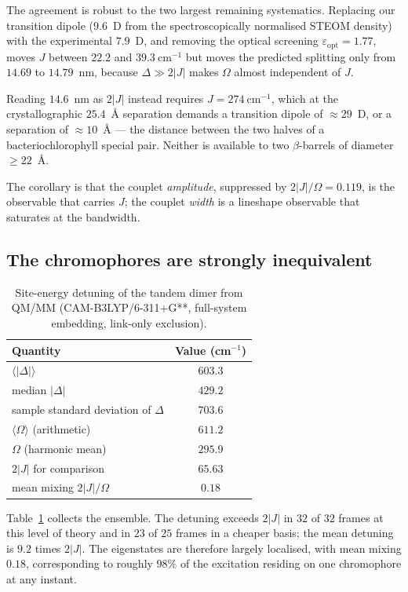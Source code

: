\documentclass[journal=jpcbfk, manuscript=article, layout=twocolumn, doi=true]{achemso}
\begin{document}
The agreement is robust to the two largest remaining systematics. Replacing
our transition dipole ($9.6$~D from the spectroscopically normalised STEOM
density) with the experimental $7.9$~D, and removing the optical screening
$\varepsilon_{\mathrm{opt}} = 1.77$, moves $J$ between $22.2$ and
$39.3~\mathrm{cm^{-1}}$ but moves the predicted splitting only from $14.69$ to
$14.79$~nm, because $\Delta \gg 2|J|$ makes $\Omega$ almost independent of $J$.

Reading $14.6$~nm as $2|J|$ instead requires $J = 274~\mathrm{cm^{-1}}$, which
at the crystallographic $25.4$~\AA{} separation demands a transition dipole of
$\approx 29$~D, or a separation of $\approx 10$~\AA{} --- the distance between
the two halves of a bacteriochlorophyll special pair. Neither is available to
two $\beta$-barrels of diameter $\geq 22$~\AA.

The corollary is that the couplet \emph{amplitude}, suppressed by
$2|J|/\Omega = 0.119$, is the observable that carries $J$; the couplet
\emph{width} is a lineshape observable that saturates at the bandwidth.

\subsection{The chromophores are strongly inequivalent}

\begin{table}[t]
\centering
\caption{Site-energy detuning of the tandem dimer from QM/MM
(CAM-B3LYP/6-311+G**, full-system embedding, link-only exclusion).}
\label{tab:detuning}
\begin{tabular}{lc}
\toprule
Quantity & Value (cm$^{-1}$) \\
\midrule
$\langle|\Delta|\rangle$              & $603.3$ \\
median $|\Delta|$                     & $429.2$ \\
sample standard deviation of $\Delta$ & $703.6$ \\
$\langle\Omega\rangle$ (arithmetic)   & $611.2$ \\
$\Omega$ (harmonic mean)              & $295.9$ \\
$2|J|$ for comparison                 & $65.63$ \\
mean mixing $2|J|/\Omega$             & $0.18$ \\
\bottomrule
\end{tabular}
\end{table}

Table~\ref{tab:detuning} collects the ensemble. The detuning exceeds $2|J|$ in
$32$ of $32$ frames at this level of theory and in $23$ of $25$ frames in a
cheaper basis; the mean detuning is $9.2$ times $2|J|$. The eigenstates are
therefore largely localised, with mean mixing $0.18$, corresponding to roughly
$98\%$ of the excitation residing on one chromophore at any instant.
\end{document}
